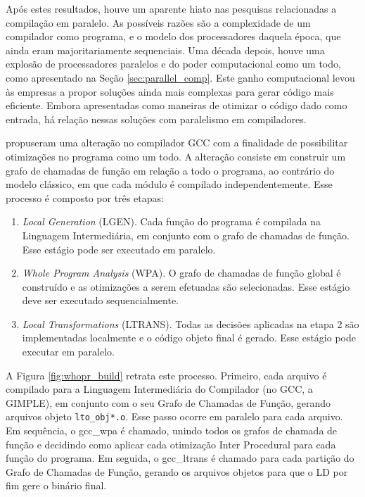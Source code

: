 Após estes resultados, houve um aparente hiato nas pesquisas relacionadas a
compilação em paralelo. As possíveis razões são a complexidade de um compilador
como programa, e o modelo dos processadores daquela época, que ainda eram
majoritariamente sequenciais. Uma década depois, houve uma explosão de processadores
paralelos e do poder computacional como um todo, como apresentado na Seção
\ref{sec:parallel_comp}. Este ganho computacional levou às empresas a propor soluções
ainda mais complexas para
gerar código mais eficiente. Embora apresentadas como maneiras de otimizar o código
dado como entrada, há relação nessas soluções com paralelismo em compiladores.

\cite{whoprgoogle} propuseram uma alteração no
compilador GCC com a finalidade
de possibilitar otimizações no programa como um todo. A alteração consiste
em construir um grafo de chamadas de função em relação a todo o programa,
ao contrário do modelo clássico, em que cada módulo é compilado independentemente.
Esse processo é composto por três etapas:
\begin{enumerate}
    \item \textit{Local Generation } (LGEN). Cada função do programa é compilada
        na Linguagem Intermediária, em conjunto com o grafo de chamadas de função.
        Esse estágio pode ser executado em paralelo.

    \item \textit{Whole Program Analysis} (WPA). O grafo de chamadas de função global
        é construído e as otimizações a serem efetuadas são selecionadas. Esse estágio
        deve ser executado sequencialmente.

    \item \textit{Local Transformations} (LTRANS). Todas as decisões aplicadas na
        etapa 2 são implementadas localmente e o código objeto final é gerado.
        Esse estágio pode executar em paralelo.
\end{enumerate}

A Figura \ref{fig:whopr_build} retrata este processo. Primeiro, cada arquivo é
compilado para a Linguagem Intermediária do Compilador (no GCC, a GIMPLE), em
conjunto com o seu Grafo de Chamadas de Função, gerando arquivos objeto
\texttt{lto\_obj*.o}. Esse passo ocorre em paralelo para cada arquivo. 
Em sequência, o gcc\_wpa é chamado, unindo todos os grafos
de chamada de função e decidindo como aplicar cada otimização Inter Procedural para
cada função do programa. Em seguida, o gcc\_ltrans é chamado para cada partição do
Grafo de Chamadas de Função, gerando os arquivos objetos para que o LD por
fim gere o binário final.

